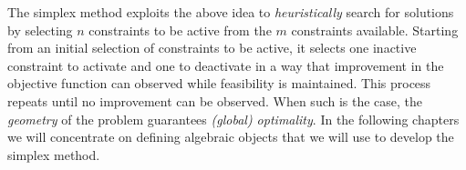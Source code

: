 The simplex method exploits the above idea to \emph{heuristically} search for solutions by selecting $n$ constraints to be active from the $m$ constraints available. Starting from an initial selection of constraints to be active, it selects one inactive constraint to activate and one to deactivate in a way that improvement in the objective function can observed while feasibility is maintained. This process repeats until no improvement can be observed. When such is the case, the \emph{geometry} of the problem guarantees \emph{(global) optimality}. In the following chapters we will concentrate on defining algebraic objects that we will use to develop the simplex method.


